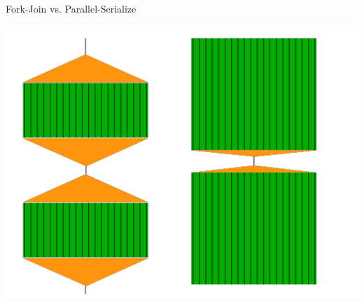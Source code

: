 \documentclass[11pt]{beamer}
\begin{document}
\begin{frame}{Fork-Join vs. Parallel-Serialize}
  \begin{center}
    \includegraphics[scale=0.3,angle=0]{ForkJoin.pdf}
  \end{center}
\end{frame}
\end{document}
